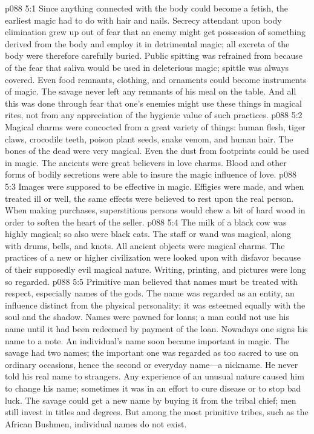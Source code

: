 \vs p088 5:1 Since anything connected with the body could become a fetish, the earliest magic had to do with hair and nails. Secrecy attendant upon body elimination grew up out of fear that an enemy might get possession of something derived from the body and employ it in detrimental magic; all excreta of the body were therefore carefully buried. Public spitting was refrained from because of the fear that saliva would be used in deleterious magic; spittle was always covered. Even food remnants, clothing, and ornaments could become instruments of magic. The savage never left any remnants of his meal on the table. And all this was done through fear that one’s enemies might use these things in magical rites, not from any appreciation of the hygienic value of such practices.
\vs p088 5:2 Magical charms were concocted from a great variety of things: human flesh, tiger claws, crocodile teeth, poison plant seeds, snake venom, and human hair. The bones of the dead were very magical. Even the dust from footprints could be used in magic. The ancients were great believers in love charms. Blood and other forms of bodily secretions were able to insure the magic influence of love.
\vs p088 5:3 Images were supposed to be effective in magic. Effigies were made, and when treated ill or well, the same effects were believed to rest upon the real person. When making purchases, superstitious persons would chew a bit of hard wood in order to soften the heart of the seller.
\vs p088 5:4 The milk of a black cow was highly magical; so also were black cats. The staff or wand was magical, along with drums, bells, and knots. All ancient objects were magical charms. The practices of a new or higher civilization were looked upon with disfavor because of their supposedly evil magical nature. Writing, printing, and pictures were long so regarded.
\vs p088 5:5 Primitive man believed that names must be treated with respect, especially names of the gods. The name was regarded as an entity, an influence distinct from the physical personality; it was esteemed equally with the soul and the shadow. Names were pawned for loans; a man could not use his name until it had been redeemed by payment of the loan. Nowadays one signs his name to a note. An individual’s name soon became important in magic. The savage had two names; the important one was regarded as too sacred to use on ordinary occasions, hence the second or everyday name---a nickname. He never told his real name to strangers. Any experience of an unusual nature caused him to change his name; sometimes it was in an effort to cure disease or to stop bad luck. The savage could get a new name by buying it from the tribal chief; men still invest in titles and degrees. But among the most primitive tribes, such as the African Bushmen, individual names do not exist.
